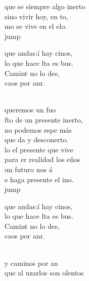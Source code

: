 \begin{cancion}
	que se siempre algo inerto\\
	sino vivir hoy, en to, \\
	mo se vive en el elo. \\jump\\
	\begin{chorus}%
	 que andas:í hay cinos,  \\
	lo que hace lta es bus.\\
	Camint no lo des,\\
	 caos por anr.\\
	\end{chorus}%
	\jump\\
	 queremos un fuo \\
	fto de un presente inerto,\\
	no podemos espe más \\
	que da y desconerto.\\
	lo el presente que vive \\
	para er realidad los eños\\
	un futuro nos á \\
	e haga presente el ino. \\jump\\
	\begin{chorus}%
	 que andas:í hay cinos,  \\
	lo que hace lta es bus.\\
	Camint no lo des,\\
	 caos por anr.\\
	\end{chorus}%
	\jump\\
	y caminos por an \\
	que al uzarlos son olentos\\

\end{cancion}
